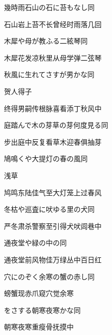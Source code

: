 \begin{haiku}
    {\FH 幾時雨石山の石に苔もなし}\hfill{\FH 同}

    {\FK 石山岩上苔不长曾经时雨落几回}
\end{haiku}

\begin{haiku}
    {\FH 木犀や母が教ふる二絃琴}\hfill{\FH 同}

    {\FK 木犀花发凉秋里从母学弹二弦琴}
\end{haiku}

\begin{haiku}
    {\FH 秋風に生れてさすが男かな}\hfill{\FH 同}

    {\FK 贺人得子}

    {\FK 终得男嗣传根脉喜看添丁秋风中}
\end{haiku}

\begin{haiku}
    {\FH 庭踏んで木の芽草の芽何度見る}\hfill{\FH 同}

    {\FK 步出庭中反复看草木迎春俱抽芽}
\end{haiku}

\begin{haiku}
    {\FH 鳩鳴くや大提灯の春の風}\hfill{\FH 同}

    {\FK 浅草}

    {\FK 鸠鸣东陆佳气至大灯笼上过春风}
\end{haiku}

\begin{haiku}
    {\FH 冬枯や巡査に吠ゆる里の犬}\hfill{\FH 同}

    {\FK 严冬肃杀警察至引得犬吠闾巷中}
\end{haiku}

\begin{haiku}
    {\FH 通夜堂や緑の中の}\hfill{\FH 同}

    {\FK 通夜堂前风物佳万绿丛中百日红}
\end{haiku}

\begin{haiku}
    {\FH 穴にのぞく余寒の蟹の赤し}\hfill{\FH 同}

    {\FK 螃蟹现赤爪窥穴觉余寒}
\end{haiku}

\begin{haiku}
    {\FH {}をさする朝寒夜寒かな}\hfill{\FH 同}

    {\FK 朝寒夜寒重瘦骨抚摸中}
\end{haiku}

